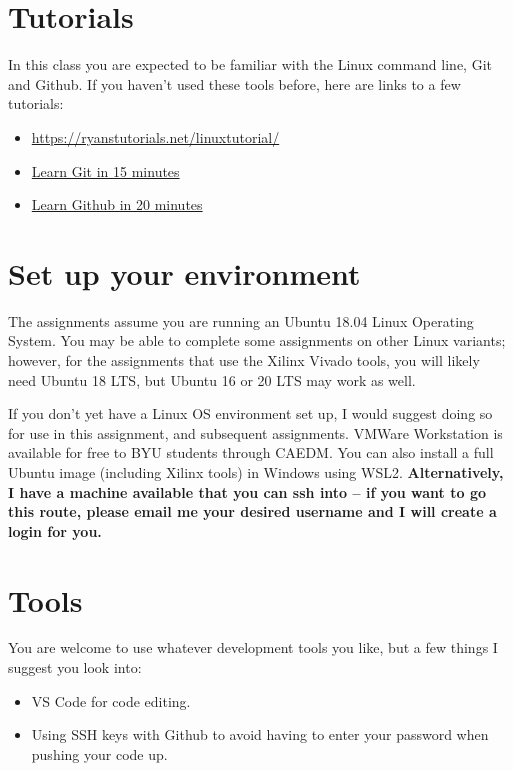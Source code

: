



\setuppage



\maketitle
\thispagestyle{fancy}

\section{Tutorials} 
In this class you are expected to be familiar with the Linux command line, Git and Github.  If you haven't used these tools before, here are links to a few tutorials:
\begin{itemize}
	\item \url{https://ryanstutorials.net/linuxtutorial/}
	\item \href{https://www.youtube.com/watch?v=USjZcfj8yxE}{Learn Git in 15 minutes}
	\item \href{https://www.youtube.com/watch?v=nhNq2kIvi9s}{Learn Github in 20 minutes}
\end{itemize}

\section{Set up your environment}
The assignments assume you are running an Ubuntu 18.04 Linux Operating System.  You may be able to complete some assignments on other Linux variants; however, for the assignments that use the Xilinx Vivado tools, you will likely need Ubuntu 18 LTS, but Ubuntu 16 or 20 LTS may work as well.

If you don't yet have a Linux OS environment set up, I would suggest doing so for use in this assignment, and subsequent assignments. VMWare Workstation is available for free to BYU students through CAEDM. You can also install a full Ubuntu image (including Xilinx tools) in Windows using WSL2.  \textbf{Alternatively, I have a machine available that you can ssh into -- if you want to go this route, please email me your desired username and I will create a login for you.}

\section{Tools}
You are welcome to use whatever development tools you like, but a few things I suggest you look into:
\begin{itemize}
    \item VS Code for code editing.
    \item Using SSH keys with Github to avoid having to enter your password when pushing your code up.
\end{itemize}

